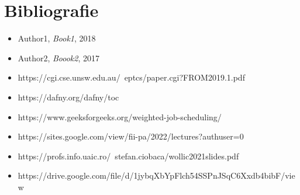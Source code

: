 \chapter*{Bibliografie} 

\begin{itemize}
    \item Author1, \textit{Book1}, 2018
    \item Author2, \textit{Boook2}, 2017
    \item https://cgi.cse.unsw.edu.au/~eptcs/paper.cgi?FROM2019.1.pdf
    \item https://dafny.org/dafny/toc
    \item https://www.geeksforgeeks.org/weighted-job-scheduling/
    \item https://sites.google.com/view/fii-pa/2022/lectures?authuser=0
    \item https://profs.info.uaic.ro/~stefan.ciobaca/wollic2021slides.pdf
    \item https://drive.google.com/file/d/1jybqXbYpFlch54SSPnJSqC6Xxdb4bibF/view
\end{itemize}